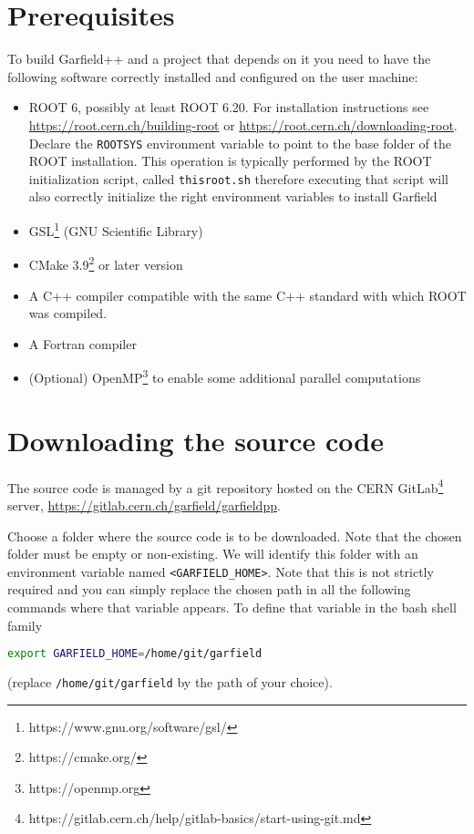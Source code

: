 \section{Prerequisites}

To build Garfield++ and a project that depends on it you need to have the following software correctly installed and configured on the user machine:

\begin{itemize}
	\item ROOT 6, possibly at least ROOT 6.20. For installation instructions 
	see \url{https://root.cern.ch/building-root} or
	\url{https://root.cern.ch/downloading-root}. 
	Declare the \texttt{ROOTSYS} environment variable to point to the base folder of the ROOT installation. 
	This operation is typically performed by the ROOT initialization script, called \texttt{thisroot.sh} therefore executing that script will also correctly initialize the right environment variables to install Garfield
	\item GSL\footnote{https://www.gnu.org/software/gsl/} (GNU Scientific Library)
	\item CMake 3.9\footnote{https://cmake.org/} or later version 
	\item A C++ compiler compatible with the same C++ standard with which ROOT was compiled.
	\item A Fortran compiler
	\item (Optional) OpenMP\footnote{https://openmp.org} to enable some additional parallel computations 
\end{itemize}

\section{Downloading the source code}

The source code is managed by a git repository hosted on the CERN GitLab\footnote{https://gitlab.cern.ch/help/gitlab-basics/start-using-git.md} server,
\url{https://gitlab.cern.ch/garfield/garfieldpp}.

Choose a folder where the source code is to be downloaded. Note that the chosen folder must be empty or non-existing. We will identify this folder with an environment variable named \texttt{<GARFIELD\_HOME>}. Note that this is not strictly required and you can simply replace the chosen path in all the following commands where that variable appears. To define that variable in the bash shell family

\begin{lstlisting}[language=bash]
	export GARFIELD_HOME=/home/git/garfield
\end{lstlisting} 
(replace \texttt{/home/git/garfield} by the path of your choice).

